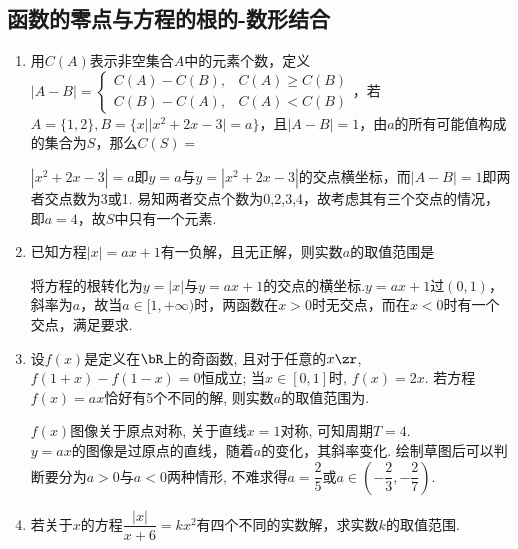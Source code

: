     \subsection*{函数的零点与方程的根的-数形结合}
    \begin{enumerate}
        \item 用$C(A)$表示非空集合$A$中的元素个数，定义$|A-B| = \left \{ \begin{array}{ll}
            C(A) - C(B), & C(A) \geq C(B) \\
            C(B) - C(A), & C(A) < C(B)
        \end{array}\right.$，若$A = \{1,2\}, B = \{x | |x^2+2x-3| = a\}$，且$|A-B| = 1$，由$a$的所有可能值构成的集合为$S$，那么$C(S) = $
        \begin{jieda}
            $|x^2+2x-3| = a$即$y = a$与$y = |x^2+2x-3|$的交点横坐标，而$|A-B| = 1$即两者交点数为3或1. 易知两者交点个数为0,2,3,4，故考虑其有三个交点的情况，即$a = 4$，故$S$中只有一个元素.
        \end{jieda}
        \item 已知方程$|x| = ax+1$有一负解，且无正解，则实数$a$的取值范围是\blkda{$[1, +\infty)$ }
        \begin{jieda}
            将方程的根转化为$y = |x|$与$y = ax+1$的交点的横坐标.$y = ax+1$过$(0, 1)$，斜率为$a$，故当$a \in [1, +\infty)$时，两函数在$x > 0$时无交点，而在$x < 0$时有一个交点，满足要求.
        \end{jieda}
        \item 设$f(x)$是定义在$\bR$上的奇函数, 且对于任意的$x\zr$, $f(1+x)-f(1-x)=0$恒成立; 当$x\in[0,1]$时, $f(x)=2x$. 
        若方程$f(x)=ax$恰好有5个不同的解, 则实数$a$的取值范围为. 
        \begin{jieda}
        $f(x)$图像关于原点对称, 关于直线$x=1$对称, 可知周期$T=4$. \\
        $y = ax$的图像是过原点的直线，随着$a$的变化，其斜率变化. 绘制草图后可以判断要分为$a>0$与$a<0$两种情形, 
        不难求得$a=\dfrac{2}{5}$或$a\in\left(-\dfrac{2}{3},-\dfrac{2}{7}\right)$. 
        \end{jieda}
        \item 若关于$x$的方程$\dfrac{|x|}{x+6} = kx^2$有四个不同的实数解，求实数$k$的取值范围.
\end{enumerate}
